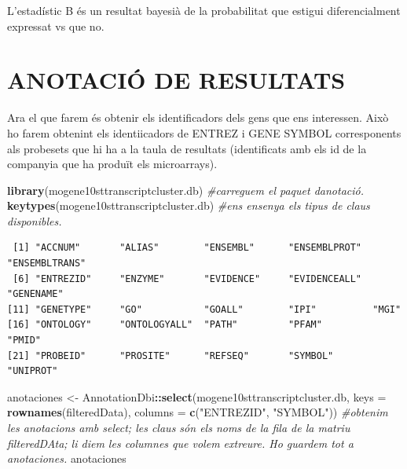 \documentclass[
]{article}
\newenvironment{Shaded}{\begin{snugshade}}{\end{snugshade}}
\newcommand{\AttributeTok}[1]{\textcolor[rgb]{0.13,0.29,0.53}{#1}}
\newcommand{\CommentTok}[1]{\textcolor[rgb]{0.56,0.35,0.01}{\textit{#1}}}
\newcommand{\FunctionTok}[1]{\textcolor[rgb]{0.13,0.29,0.53}{\textbf{#1}}}
\newcommand{\NormalTok}[1]{#1}
\newcommand{\OtherTok}[1]{\textcolor[rgb]{0.56,0.35,0.01}{#1}}
\newcommand{\SpecialCharTok}[1]{\textcolor[rgb]{0.81,0.36,0.00}{\textbf{#1}}}
\newcommand{\StringTok}[1]{\textcolor[rgb]{0.31,0.60,0.02}{#1}}
\begin{document}
L'estadístic B és un resultat bayesià de la probabilitat que estigui
diferencialment expressat vs que no.

\section{ANOTACIÓ DE RESULTATS}\label{anotaciuxf3-de-resultats}

Ara el que farem és obtenir els identificadors dels gens que ens
interessen. Això ho farem obtenint els identiicadors de ENTREZ i GENE
SYMBOL corresponents als probesets que hi ha a la taula de resultats
(identificats amb els id de la companyia que ha produït els
microarrays).

\begin{Shaded}
\begin{Highlighting}[]
\FunctionTok{library}\NormalTok{(mogene10sttranscriptcluster.db)  }\CommentTok{\#carreguem el paquet d\textquotesingle{}anotació. }
\FunctionTok{keytypes}\NormalTok{(mogene10sttranscriptcluster.db)  }\CommentTok{\#ens ensenya els tipus de claus disponibles. }
\end{Highlighting}
\end{Shaded}

\begin{verbatim}
 [1] "ACCNUM"       "ALIAS"        "ENSEMBL"      "ENSEMBLPROT"  "ENSEMBLTRANS"
 [6] "ENTREZID"     "ENZYME"       "EVIDENCE"     "EVIDENCEALL"  "GENENAME"    
[11] "GENETYPE"     "GO"           "GOALL"        "IPI"          "MGI"         
[16] "ONTOLOGY"     "ONTOLOGYALL"  "PATH"         "PFAM"         "PMID"        
[21] "PROBEID"      "PROSITE"      "REFSEQ"       "SYMBOL"       "UNIPROT"     
\end{verbatim}

\begin{Shaded}
\begin{Highlighting}[]
\NormalTok{anotaciones }\OtherTok{\textless{}{-}}\NormalTok{ AnnotationDbi}\SpecialCharTok{::}\FunctionTok{select}\NormalTok{(mogene10sttranscriptcluster.db, }\AttributeTok{keys =} \FunctionTok{rownames}\NormalTok{(filteredData),}
    \AttributeTok{columns =} \FunctionTok{c}\NormalTok{(}\StringTok{"ENTREZID"}\NormalTok{, }\StringTok{"SYMBOL"}\NormalTok{))  }\CommentTok{\#obtenim les anotacions amb select; les claus són els noms de la fila de la matriu filteredDAta; li diem les columnes que volem extreure. Ho guardem tot a anotaciones. }
\NormalTok{anotaciones}
\end{Highlighting}
\end{Shaded}
\end{document}
